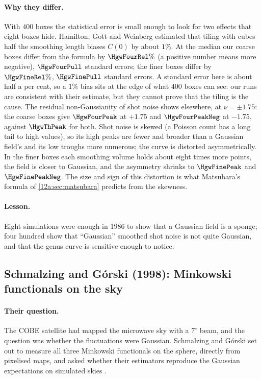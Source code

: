 \paragraph{Why they differ.} With $400$ boxes the statistical error is small enough to look for two effects that
eight boxes hide. Hamilton, Gott and Weinberg estimated that tiling with cubes half the smoothing length biases $C(0)$
by about $1\%$. At the median our coarse boxes differ from the formula by $\HgwFourRel\%$ (a positive number means more
negative), $\HgwFourPull$ standard errors; the finer boxes differ by $\HgwFineRel\%$, $\HgwFinePull$ standard errors. A
standard error here is about half a per cent, so a $1\%$ bias sits at the edge of what $400$ boxes can see: our runs are
consistent with their estimate, but they cannot prove that the tiling is the cause. The residual non-Gaussianity of shot noise shows elsewhere, at $\nu=\pm1.75$: the coarse boxes give
$\HgwFourPeak$ at $+1.75$ and $\HgwFourPeakNeg$ at $-1.75$, against $\HgwThPeak$ for both. Shot noise is skewed
(a Poisson count has a long tail to high values), so its high peaks are fewer and broader than a Gaussian
field's and its low troughs more numerous; the curve is distorted asymmetrically. In the finer boxes each
smoothing volume holds about eight times more points, the field is closer to Gaussian, and the asymmetry
shrinks to $\HgwFinePeak$ and $\HgwFinePeakNeg$. The size and sign of this distortion is what Matsubara's
formula of \cref{12a:sec:matsubara} predicts from the skewness.

\paragraph{Lesson.} Eight simulations were enough in 1986 to show that a Gaussian field is a sponge; four
hundred show that ``Gaussian'' smoothed shot noise is not quite Gaussian, and that the genus curve is
sensitive enough to notice.

\subsection{Schmalzing and G\'orski (1998): Minkowski functionals on the sky}
\label{12a:sec:sg98}

\paragraph{Their question.} The COBE satellite had mapped the microwave sky with a $7^\circ$ beam, and the
question was whether the fluctuations were Gaussian. Schmalzing and G\'orski set out to measure all three
Minkowski functionals on the sphere, directly from pixelised maps, and asked whether their estimators
reproduce the Gaussian expectations on simulated skies \cite{SchmalzingGorski1998}.

